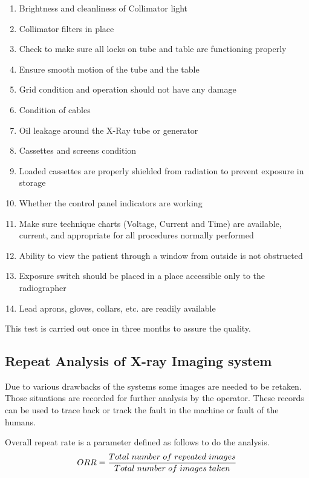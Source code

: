 \documentclass[12pt]{article}
\begin{document}
\begin{enumerate}
    \item Brightness and cleanliness of Collimator light
    \item Collimator filters in place
    \item Check to make sure all locks on tube and table are functioning properly
    \item Ensure smooth motion of the tube and the table
    \item Grid condition and operation should not have any damage
    \item Condition of cables
    \item Oil leakage around the X-Ray tube or generator
    \item Cassettes and screens condition
    \item Loaded cassettes are properly shielded from radiation to prevent exposure in storage
    \item Whether the control panel indicators are working
    \item Make sure technique charts (Voltage, Current and Time) are available, current, and appropriate for all procedures normally performed
    \item Ability to view the patient through a window from outside is not obstructed
    \item Exposure switch should be placed in a place accessible only to the radiographer
    \item Lead aprons, gloves, collars, etc. are readily available

\end{enumerate}
This test is carried out once in three months to assure the quality.

\subsection{Repeat Analysis of X-ray Imaging system}
Due to various drawbacks of the systems some images are needed to be retaken. Those situations are recorded for further analysis by the operator. These records can be used to trace back or track the fault in the machine or fault of the humans. 

Overall repeat rate is a parameter defined as follows to do the analysis. 
\begin{equation}
    \centering
    ORR = \frac{Total\hspace{0.1 cm}number\hspace{0.1 cm} of\hspace{0.1 cm} repeated\hspace{0.1 cm} images}{Total\hspace{0.1 cm} number\hspace{0.1 cm} of\hspace{0.1 cm} images\hspace{0.1 cm} taken}
\end{equation}
\end{document}
